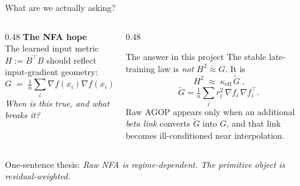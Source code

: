 \documentclass[10pt,aspectratio=169]{beamer}
\newcommand{\T}{^{\!\top}}
\newcommand{\Gw}{\widetilde{G}}
\begin{document}
\begin{frame}{What are we actually asking?}
  \begin{columns}[T,onlytextwidth]
    \begin{column}{0.48\textwidth}
      \textbf{The NFA hope}\\[4pt]
      The learned input metric $H := B\T B$ should reflect input-gradient geometry:
      \[ G \;=\; \tfrac{1}{n}\sum_i \nabla f(x_i)\nabla f(x_i)\T. \]
      \vspace{2pt}
      \emph{When is this true, and what breaks it?}
    \end{column}
    \begin{column}{0.48\textwidth}
      \vspace{-8pt}
      \begin{ibox}{The answer in this project}
        The stable late-training law is \emph{not} $H^2 \approx G$. It is
        \[ \boxed{\; H^2 \;\approx\; \kappa_{\mathrm{eff}}\, \Gw \;}, \]
        \[ \Gw = \tfrac{1}{n}\!\sum_i r_i^2\,\nabla f_i\,\nabla f_i\T. \]
        Raw AGOP appears only when an additional \emph{beta link} converts $\Gw$ into $G$, and that link becomes ill-conditioned near interpolation.
      \end{ibox}
    \end{column}
  \end{columns}
  \vspace{8pt}
  \centering
  {\small\color{nicegray}One-sentence thesis: \emph{Raw NFA is regime-dependent. The primitive object is residual-weighted.}}
\end{frame}
\end{document}
